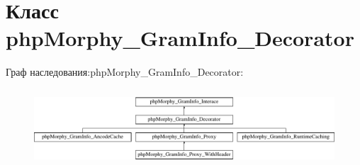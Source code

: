 \hypertarget{classphpMorphy__GramInfo__Decorator}{
\section{Класс phpMorphy\_\-GramInfo\_\-Decorator}
\label{classphpMorphy__GramInfo__Decorator}
}
Граф наследования:phpMorphy\_\-GramInfo\_\-Decorator:\begin{figure}[H]
\begin{center}
\leavevmode
\includegraphics[height=2.916667cm]{classphpMorphy__GramInfo__Decorator}
\end{center}
\end{figure}
